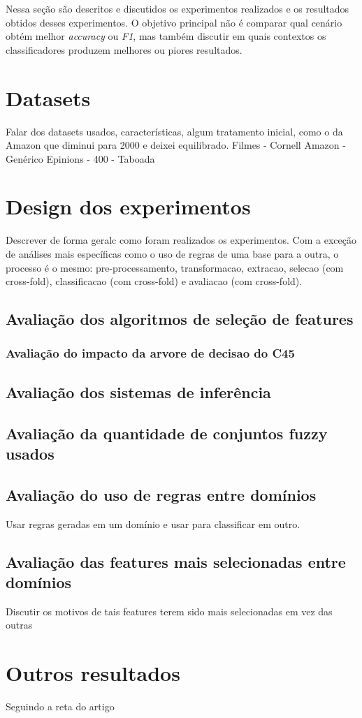 
Nessa seção são descritos e discutidos os experimentos realizados e os resultados obtidos desses experimentos. O objetivo principal não é comparar qual cenário obtém melhor \textit{accuracy} ou \textit{F1}, mas também discutir em quais contextos os classificadores produzem melhores ou piores resultados.

\section{Datasets}

Falar dos datasets usados, características, algum tratamento inicial, como o da Amazon que diminui para 2000 e deixei equilibrado.
Filmes - Cornell
Amazon - Genérico
Epinions - 400 - Taboada

\section{Design dos experimentos}

Descrever de forma geralc como foram realizados os experimentos. Com a exceção de análises mais específicas como o uso de regras de uma base para a outra, o processo é o mesmo: pre-processamento, transformacao, extracao, selecao (com cross-fold), classificacao (com cross-fold) e avaliacao (com cross-fold).

\subsection{Avaliação dos algoritmos de seleção de features}

\subsubsection{Avaliação do impacto da arvore de decisao do C45}

\subsection{Avaliação dos sistemas de inferência}

\subsection{Avaliação da quantidade de conjuntos fuzzy usados}

\subsection{Avaliação do uso de regras entre domínios}

Usar regras geradas em um domínio e usar para classificar em outro.

\subsection{Avaliação das features mais selecionadas entre domínios}

Discutir os motivos de tais features terem sido mais selecionadas em vez das outras

\section{Outros resultados}

Seguindo a reta do artigo
